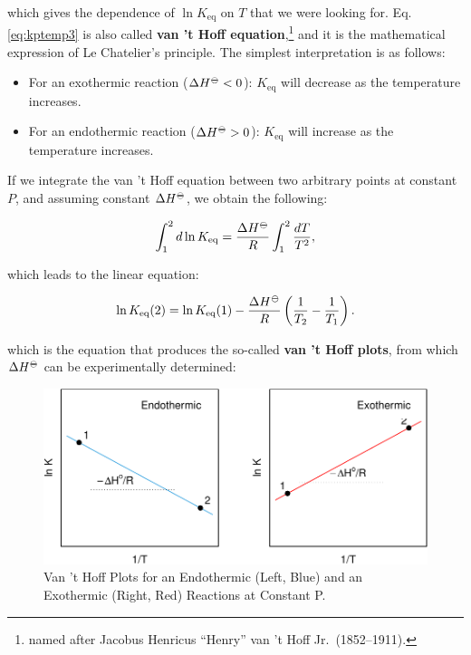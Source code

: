 \documentclass[
  9pt,
]{extbook}
\providecommand{\tightlist}{%
  \setlength{\itemsep}{0pt}\setlength{\parskip}{0pt}}
\theoremstyle{definition}
\theoremstyle{definition}
\theoremstyle{definition}
\theoremstyle{definition}
\theoremstyle{remark}
\begin{document}
which gives the dependence of \(\ln K_{\text{eq}}\) on \(T\) that we were looking for. Eq. \eqref{eq:kptemp3} is also called \textbf{van 't Hoff equation},\footnote{named after Jacobus Henricus ``Henry'' van 't Hoff Jr.~(1852--1911).} and it is the mathematical expression of Le Chatelier's principle. The simplest interpretation is as follows:

\begin{itemize}
\tightlist
\item
  For an exothermic reaction (\(\Delta H^{-\kern-6pt{\ominus}\kern-6pt-}< 0\)): \(K_{\text{eq}}\) will decrease as the temperature increases.
\item
  For an endothermic reaction (\(\Delta H^{-\kern-6pt{\ominus}\kern-6pt-}> 0\)): \(K_{\text{eq}}\) will increase as the temperature increases.
\end{itemize}

If we integrate the van 't Hoff equation between two arbitrary points at constant \(P\), and assuming constant \(\Delta H^{-\kern-6pt{\ominus}\kern-6pt-}\), we obtain the following:

\begin{equation}
\int_1^2 d \ln K_{\text{eq}} = \frac{\Delta H^{-\kern-6pt{\ominus}\kern-6pt-}}{R} \int_1^2 \frac{dT}{T^2},
\label{eq:kptemp4}
\end{equation}

which leads to the linear equation:

\begin{equation}
\ln K_{\text{eq}}(2) = \ln K_{\text{eq}}(1) - \frac{\Delta H^{-\kern-6pt{\ominus}\kern-6pt-}}{R} \left( \frac{1}{T_2}-\frac{1}{T_1} \right).
\label{eq:vthoffeqI}
\end{equation}

which is the equation that produces the so-called \textbf{van 't Hoff plots}, from which \(\Delta H^{-\kern-6pt{\ominus}\kern-6pt-}\) can be experimentally determined:

\begin{figure}

{\centering \includegraphics{pchem1_files/figure-latex/vthoffplt-1} 

}

\caption{Van 't Hoff Plots for an Endothermic (Left, Blue) and an Exothermic (Right, Red) Reactions at Constant P.}\label{fig:vthoffplt}
\end{figure}
\end{document}
